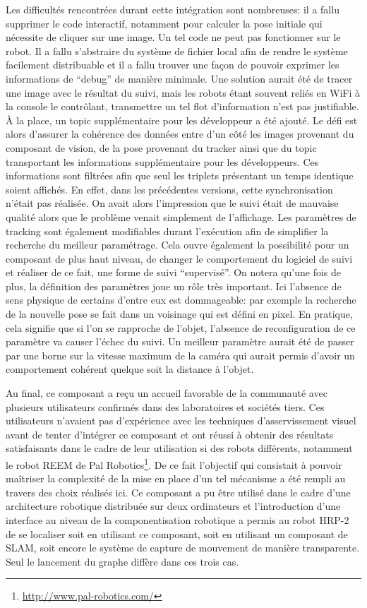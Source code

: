 Les difficultés rencontrées durant cette intégration sont nombreuses:
il a fallu supprimer le code interactif, notamment pour calculer la
pose initiale qui nécessite de cliquer sur une image. Un tel code ne
peut pas fonctionner sur le robot. Il a fallu s'abstraire du système
de fichier local afin de rendre le système facilement distribuable et
il a fallu trouver une façon de pouvoir exprimer les informations de
``debug'' de manière minimale. Une solution aurait été de tracer une
image avec le résultat du suivi, mais les robots étant souvent reliés
en WiFi à la console le contrôlant, transmettre un tel flot
d'information n'est pas justifiable. À la place, un topic
supplémentaire pour les développeur a été ajouté. Le défi est alors
d'assurer la cohérence des données entre d'un côté les images
provenant du composant de vision, de la pose provenant du tracker
ainsi que du topic transportant les informations supplémentaire pour
les développeurs. Ces informations sont filtrées afin que seul les
triplets présentant un temps identique soient affichés. En effet, dans
les précédentes versions, cette synchronisation n'était pas
réalisée. On avait alors l'impression que le suivi était de mauvaise
qualité alors que le problème venait simplement de l'affichage. Les
paramètres de tracking sont également modifiables durant l'exécution
afin de simplifier la recherche du meilleur paramétrage. Cela ouvre
également la possibilité pour un composant de plus haut niveau, de
changer le comportement du logiciel de suivi et réaliser de ce fait,
une forme de suivi ``supervisé''. On notera qu'une fois de plus, la
définition des paramètres joue un rôle très important. Ici l'absence
de sens physique de certains d'entre eux est dommageable: par exemple
la recherche de la nouvelle pose se fait dans un voisinage qui est
défini en pixel. En pratique, cela signifie que si l'on se rapproche
de l'objet, l'absence de reconfiguration de ce paramètre va causer
l'échec du suivi. Un meilleur paramètre aurait été de passer par une
borne sur la vitesse maximum de la caméra qui aurait permis d'avoir un
comportement cohérent quelque soit la distance à l'objet.


Au final, ce composant a reçu un accueil favorable de la communauté
avec plusieurs utilisateurs confirmés dans des laboratoires et
sociétés tiers. Ces utilisateurs n'avaient pas d'expérience avec les
techniques d'asservissement visuel avant de tenter d'intégrer ce
composant et ont réussi à obtenir des résultats satisfaisants dans le
cadre de leur utilisation si des robots différents, notamment le robot
REEM de Pal Robotics\footnote{\url{http://www.pal-robotics.com/}}. De
ce fait l'objectif qui consistait à pouvoir maîtriser la complexité de
la mise en place d'un tel mécanisme a été rempli au travers des choix
réalisés ici. Ce composant a pu être utilisé dans le cadre d'une
architecture robotique distribuée sur deux ordinateurs et
l'introduction d'une interface au niveau de la componentisation
robotique a permis au robot HRP-2 de se localiser soit en utilisant ce
composant, soit en utilisant un composant de SLAM, soit encore le
système de capture de mouvement de manière transparente. Seul le
lancement du graphe diffère dans ces trois cas.


